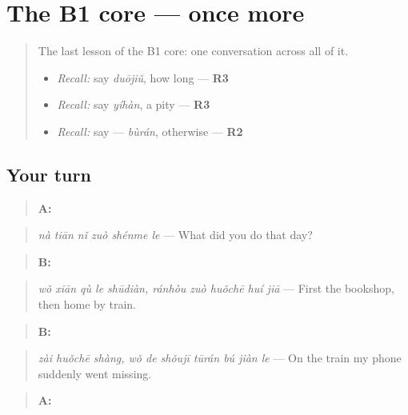 \section[(dialogue)]{The B1 core — once more}

\label{lesson:ZH-R289-review-final-289}



\begin{quote}
The last lesson of the B1 core: one conversation across all of it.

\begin{itemize}
\raggedright
  \item \emph{Recall:} say \emph{duōjiǔ}, how long — \textbf{R3}
  \item \emph{Recall:} say \emph{yíhàn}, a pity — \textbf{R3}
  \item \emph{Recall:} say  — \emph{bùrán}, otherwise — \textbf{R2}
\end{itemize}
\end{quote}

\subsection*{Your turn}
\begin{quote}
\textbf{A:} 
\end{quote}

\begin{quote}
\emph{nà tiān nǐ zuò shénme le} — What did you do that day?
\end{quote}

\begin{quote}
\textbf{B:}  
\end{quote}

\begin{quote}
\emph{wǒ xiān qù le shūdiàn, ránhòu zuò huǒchē huí jiā} — First the bookshop, then home by train.
\end{quote}

\begin{quote}
\textbf{B:}  
\end{quote}

\begin{quote}
\emph{zài huǒchē shàng, wǒ de shǒujī tūrán bú jiàn le} — On the train my phone suddenly went missing.
\end{quote}

\begin{quote}
\textbf{A:} 
\end{quote}

